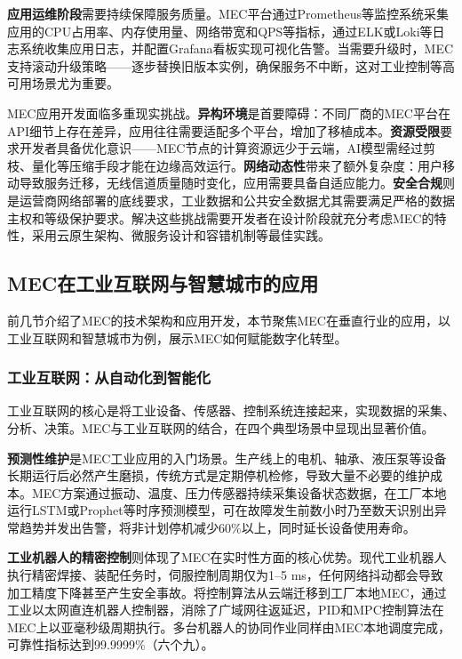 \textbf{应用运维阶段}需要持续保障服务质量。MEC平台通过Prometheus等监控系统采集应用的CPU占用率、内存使用量、网络带宽和QPS等指标，通过ELK或Loki等日志系统收集应用日志，并配置Grafana看板实现可视化告警。当需要升级时，MEC支持滚动升级策略——逐步替换旧版本实例，确保服务不中断，这对工业控制等高可用场景尤为重要。

\begin{insightbox}[MEC应用开发的挑战]
MEC应用开发面临多重现实挑战。\textbf{异构环境}是首要障碍：不同厂商的MEC平台在API细节上存在差异，应用往往需要适配多个平台，增加了移植成本。\textbf{资源受限}要求开发者具备优化意识——MEC节点的计算资源远少于云端，AI模型需经过剪枝、量化等压缩手段才能在边缘高效运行。\textbf{网络动态性}带来了额外复杂度：用户移动导致服务迁移，无线信道质量随时变化，应用需要具备自适应能力。\textbf{安全合规}则是运营商网络部署的底线要求，工业数据和公共安全数据尤其需要满足严格的数据主权和等级保护要求。解决这些挑战需要开发者在设计阶段就充分考虑MEC的特性，采用云原生架构、微服务设计和容错机制等最佳实践。
\end{insightbox}

\subsection{MEC在工业互联网与智慧城市的应用}

前几节介绍了MEC的技术架构和应用开发，本节聚焦MEC在垂直行业的应用，以工业互联网和智慧城市为例，展示MEC如何赋能数字化转型。

\subsubsection{工业互联网：从自动化到智能化}

工业互联网的核心是将工业设备、传感器、控制系统连接起来，实现数据的采集、分析、决策。MEC与工业互联网的结合，在四个典型场景中显现出显著价值。

\textbf{预测性维护}是MEC工业应用的入门场景。生产线上的电机、轴承、液压泵等设备长期运行后必然产生磨损，传统方式是定期停机检修，导致大量不必要的维护成本。MEC方案通过振动、温度、压力传感器持续采集设备状态数据，在工厂本地运行LSTM或Prophet等时序预测模型，可在故障发生前数小时乃至数天识别出异常趋势并发出告警，将非计划停机减少60\%以上，同时延长设备使用寿命。

\textbf{工业机器人的精密控制}则体现了MEC在实时性方面的核心优势。现代工业机器人执行精密焊接、装配任务时，伺服控制周期仅为1--5 ms，任何网络抖动都会导致加工精度下降甚至产生安全事故。将控制算法从云端迁移到工厂本地MEC，通过工业以太网直连机器人控制器，消除了广域网往返延迟，PID和MPC控制算法在MEC上以亚毫秒级周期执行。多台机器人的协同作业同样由MEC本地调度完成，可靠性指标达到99.9999\%（六个九）。


